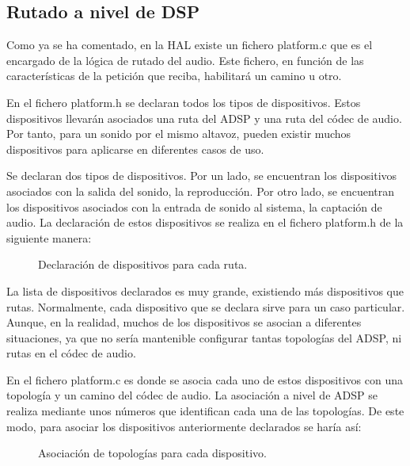 \subsection{Rutado a nivel de DSP} \label{sec:rutado_DSP}
Como ya se ha comentado, en la \gls{HAL} existe un fichero platform.c que es el encargado de la lógica de rutado del audio. Este fichero, en función de las características de la petición que reciba, habilitará un camino u otro.

En el fichero platform.h se declaran todos los tipos de dispositivos. Estos dispositivos llevarán asociados una ruta del \gls{ADSP} y una ruta del códec de audio. Por tanto, para un sonido por el mismo altavoz, pueden existir muchos dispositivos para aplicarse en diferentes casos de uso.

Se declaran dos tipos de dispositivos. Por un lado, se encuentran los dispositivos asociados con la salida del sonido, la reproducción. Por otro lado, se encuentran los dispositivos asociados con la entrada de sonido al sistema, la captación de audio. La declaración de estos dispositivos se realiza en el fichero platform.h de la siguiente manera:

\begin{figure}[H]
	\centering
	\caption{Declaración de dispositivos para cada ruta.} \label{fig:declaracion_snd}
\end{figure} 

La lista de dispositivos declarados es muy grande, existiendo más dispositivos que rutas. Normalmente, cada dispositivo que se declara sirve para un caso particular. Aunque, en la realidad, muchos de los dispositivos se asocian a diferentes situaciones, ya que no sería mantenible configurar tantas topologías del \gls{ADSP}, ni rutas en el códec de audio.

En el fichero platform.c es donde se asocia cada uno de estos dispositivos con una topología y un camino del códec de audio. La asociación a nivel de \gls{ADSP} se realiza mediante unos números que identifican cada una de las topologías. De este modo, para asociar los dispositivos anteriormente declarados se haría así:

\begin{figure}[H]
	\centering
	\caption{Asociación de topologías para cada dispositivo.} \label{fig:asociacion_acdb_id}
\end{figure} 

